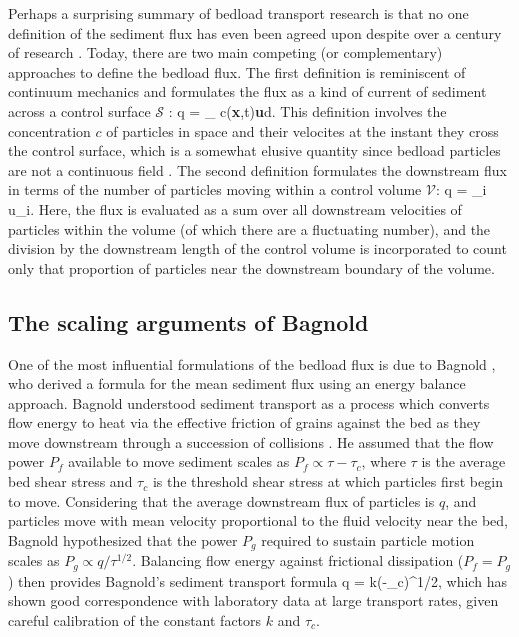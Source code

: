Perhaps a surprising summary of bedload transport research is that no one definition of the sediment flux has even been agreed upon despite over a century of research \citep{Ballio2018}.
Today, there are two main competing (or complementary) approaches to define the bedload flux. 
The first definition is reminiscent of continuum mechanics and formulates the flux as a kind of current of sediment across a control surface $\mathcal{S}$ \citep{Furbish2012,Heyman2016, Ballio2014}: 
\be q = \int_ c(\textbf{x},t)\textbf{u}\cdot d. \ee
This definition involves the concentration $c$ of particles in space and their velocites at the instant they cross the control surface, which is a somewhat elusive quantity since bedload particles are not a continuous field \citep{Heyman2016}.
The second definition formulates the downstream flux in terms of the number of particles moving within a control volume $\mathcal{V}$:
\be q =  \sum_{i\in{}} u_i. \label{eq:controlflux}\ee
Here, the flux is evaluated as a sum over all downstream velocities of particles within the volume (of which there are a fluctuating number), and the division by the downstream length of the control volume is incorporated to count only that proportion of particles near the downstream boundary of the volume.

\subsection{The scaling arguments of Bagnold}

One of the most influential formulations of the bedload flux is due to Bagnold \citep{Bagnold1956,Bagnold1966}, who derived a formula for the mean sediment flux using an energy balance approach.
Bagnold understood sediment transport as a process which converts flow energy to heat via the effective friction \citep{Bagnold1954} of grains against the bed as they move downstream through a succession of collisions \citep{Bagnold1973}.
He assumed that the flow power $P_f$ available to move sediment scales as $P_f \propto \tau - \tau_c$, where $\tau$ is the average bed shear stress and $\tau_c$ is the threshold shear stress at which particles first begin to move. 
Considering that the average downstream flux of particles is $q$, and particles move with mean velocity proportional to the fluid velocity near the bed, Bagnold hypothesized that the power $P_g$ required to sustain particle motion scales as $P_g \propto q/\tau^{1/2}.$
 Balancing flow energy against frictional dissipation ($P_f = P_g$) then provides Bagnold's sediment transport formula
\be q = k(\tau-\tau_c)\tau^{1/2}, \label{eq:bagnold}\ee
which has shown good correspondence with laboratory data at large transport rates, given careful calibration of the constant factors $k$ and $\tau_c$.

